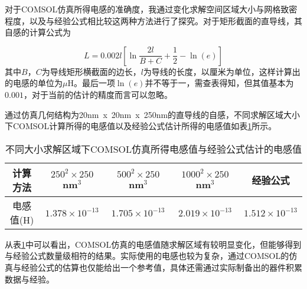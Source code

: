             
            对于COMSOL仿真所得电感的准确度，我通过变化求解空间区域大小与网格致密程度，以及与经验公式相比较这两种方法进行了探究。对于矩形截面的直导线，其自感的计算公式为\cite{grover2004inductance}

            \begin{equation}
                \label{eqn:SelfInductance}
                L = 0.002l \left [ \ln \frac{2l}{B+C} + \frac{1}{2} - \ln(e) \right ]
            \end{equation}
            其中$B$，$C$为导线矩形横截面的边长，$l$为导线的长度，以厘米为单位，这样计算出的电感的单位为$ \mu  $H。最后一项$\ln(e)$并不等于一，需查表得知，但其值基本为$0.001$，对于当前的估计的精度而言可以忽略。
            

            通过仿真几何结构为20nm~x~20nm~x~250nm的直导线的自感，不同求解区域大小下COMSOL计算所得的电感值以及经验公式估计所得的电感值如表\ref{tab:InductanceComparison}所示。


\begin{table}[htb]
  \centering
  \caption{不同大小求解区域下COMSOL仿真所得电感值与经验公式估计的电感值}
  \label{tab:InductanceComparison}
    \begin{tabular}{c|cccc} %
      \toprule %
      计算方法 & $250^2\times 250$nm$^3$ & $500^2\times 250$nm$^3$ & $1000^2\times 250$nm$^3$ & 经验公式 \\
      \midrule %
      电感值(H) & $1.378\times 10^{-13} $ & $1.705\times 10^{-13} $ & $2.019\times 10^{-13} $ & $1.512\times 10^{-13} $  \\
      \bottomrule %
    \end{tabular}
\end{table}

        
        从表\ref{tab:InductanceComparison}中可以看出，COMSOL仿真的电感值随求解区域有较明显变化，但能够得到与经验公式数量级相符的结果。实际使用的电感也较为复杂，通过COMSOL的仿真与经验公式的估算也仅能给出一个参考值，具体还需通过实际制备出的器件积累数据与经验。

    